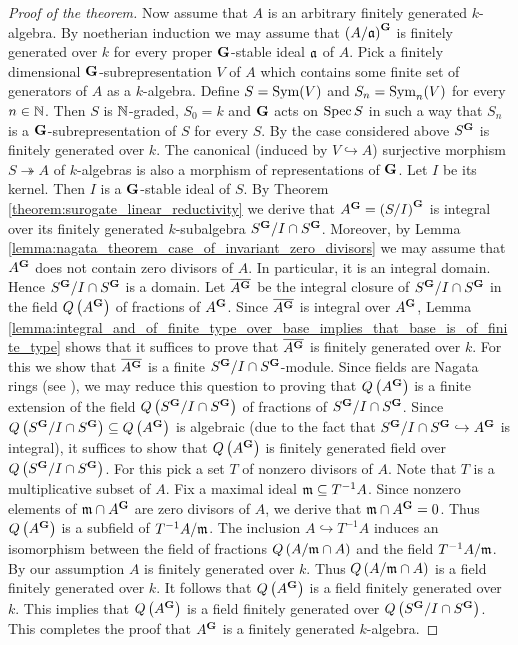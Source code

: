 \begin{proof}[Proof of the theorem]
Now assume that $A$ is an arbitrary finitely generated $k$-algebra. By noetherian induction we may assume that $\left(A/\mathfrak{a}\right)^{\mathbf{G}}$ is finitely generated over $k$ for every proper $\mathbf{G}$-stable ideal $\mathfrak{a}$ of $A$. Pick a finitely dimensional $\mathbf{G}$-subrepresentation $V$ of $A$ which contains some finite set of generators of $A$ as a $k$-algebra. Define $S = \textrm{Sym}(V)$ and $S_n = \textrm{Sym}_n(V)$ for every $n\in {\mathbb N}$. Then $S$ is ${\mathbb N}$-graded, $S_0 = k$ and $\mathbf{G}$ acts on $\mathrm{Spec}\, S$ in such a way that $S_n$ is a $\mathbf{G}$-subrepresentation of $S$ for every $S$. By the case considered above $S^{\mathbf{G}}$ is finitely generated over $k$. The canonical (induced by $V\hookrightarrow A$) surjective morphism $S\twoheadrightarrow A$ of $k$-algebras is also a morphism of representations of $\mathbf{G}$. Let $I$ be its kernel. Then $I$ is a $\mathbf{G}$-stable ideal of $S$. By Theorem \ref{theorem:surogate_linear_reductivity} we derive that $A^{\mathbf{G}}= \left(S/I\right)^{\mathbf{G}}$ is integral over its finitely generated $k$-subalgebra $S^{\mathbf{G}}/I\cap S^{\mathbf{G}}$. Moreover, by Lemma \ref{lemma:nagata_theorem_case_of_invariant_zero_divisors} we may assume that $A^{\mathbf{G}}$ does not contain zero divisors of $A$. In particular, it is an integral domain. Hence $S^{\mathbf{G}}/I\cap S^{\mathbf{G}}$ is a domain. Let $\overline{A^{\mathbf{G}}}$ be the integral closure of $S^{\mathbf{G}}/I\cap S^{\mathbf{G}}$ in the field $Q\left(A^{\mathbf{G}}\right)$ of fractions of $A^{\mathbf{G}}$. Since $\overline{A^{\mathbf{G}}}$ is integral over $A^{\mathbf{G}}$, Lemma \ref{lemma:integral_and_of_finite_type_over_base_implies_that_base_is_of_finite_type} shows that it suffices to prove that $\overline{A^{\mathbf{G}}}$ is finitely generated over $k$. For this we show that $\overline{A^{\mathbf{G}}}$ is a finite $S^{\mathbf{G}}/I\cap S^{\mathbf{G}}$-module. Since fields are Nagata rings (see {\cite[Corollary 13.13]{eisenbudcommutativealgebratowardsgeometry}}), we may reduce this question to proving that $Q\left(A^{\mathbf{G}}\right)$ is a finite extension of the field $Q\left(S^{\mathbf{G}}/I\cap S^{\mathbf{G}}\right)$ of fractions of $S^{\mathbf{G}}/I\cap S^{\mathbf{G}}$. Since $Q\left(S^{\mathbf{G}}/I\cap S^{\mathbf{G}}\right) \subseteq Q\left(A^{\mathbf{G}}\right)$ is algebraic (due to the fact that $S^{\mathbf{G}}/I\cap S^{\mathbf{G}}\hookrightarrow A^{\mathbf{G}}$ is integral), it suffices to show that $Q\left(A^{\mathbf{G}}\right)$ is finitely generated field over $Q\left(S^{\mathbf{G}}/I\cap S^{\mathbf{G}}\right)$. For this pick a set $T$ of nonzero divisors of $A$. Note that $T$ is a multiplicative subset of $A$. Fix a maximal ideal $\mathfrak{m}\subseteq T^{-1}A$. Since nonzero elements of $\mathfrak{m}\cap A^{\mathbf{G}}$ are zero divisors of $A$, we derive that $\mathfrak{m}\cap A^{\mathbf{G}} = 0$. Thus $Q\left(A^{\mathbf{G}}\right)$ is a subfield of $T^{-1}A/\mathfrak{m}$. The inclusion $A\hookrightarrow T^{-1}A$ induces an isomorphism between the field of fractions $Q\left(A/\mathfrak{m}\cap A\right)$ and the field $T^{-1}A/\mathfrak{m}$. By our assumption $A$ is finitely generated over $k$. Thus $Q\left(A/\mathfrak{m}\cap A\right)$ is a field finitely generated over $k$. It follows that $Q\left(A^{\mathbf{G}}\right)$ is a field finitely generated over $k$. This implies that $Q\left(A^{\mathbf{G}}\right)$ is a field finitely generated over $Q\left(S^{\mathbf{G}}/I\cap S^{\mathbf{G}}\right)$. This completes the proof that $A^{\mathbf{G}}$ is a finitely generated $k$-algebra.

\end{proof}
